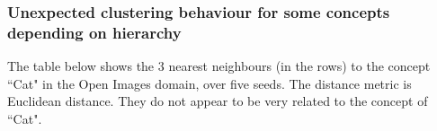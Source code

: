 %





\subsubsection{Unexpected clustering behaviour for some concepts depending on hierarchy}

The table below shows the 3 nearest neighbours (in the rows) to the concept ``Cat" in the Open Images domain, over five seeds. The distance metric is Euclidean distance. They do not appear to be very related to the concept of ``Cat".

